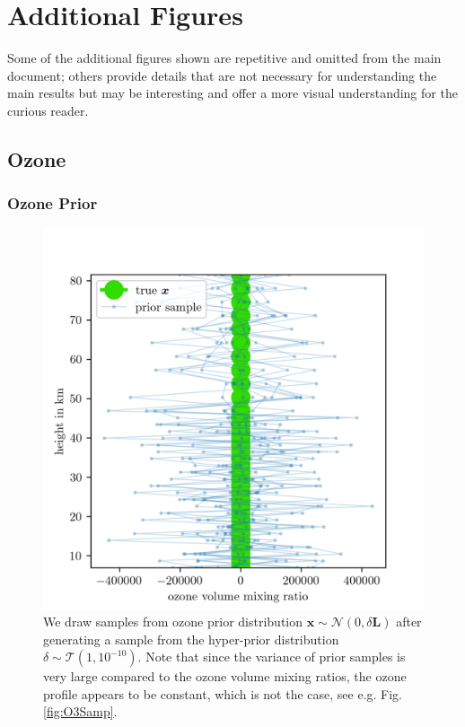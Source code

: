\chapter{Additional Figures}
\label{ap:addFig}
\thispagestyle{empty}
Some of the additional figures shown are repetitive and omitted from the main document; others provide details that are not necessary for understanding the main results but may be interesting and offer a more visual understanding for the curious reader.
\clearpage
\section{Ozone}
\subsection{Ozone Prior}
\begin{figure}[ht!]
	\centering
	\includegraphics{OzonePrior.png}
	\caption[Samples from ozone prior distribution.]{We draw samples from ozone prior distribution $\bm{x} \sim \mathcal{N}(0,\delta \bm{L})$ after generating a sample from the hyper-prior distribution $\delta \sim \mathcal{T}(1,10^{-10})$. Note that since the variance of prior samples is very large compared to the ozone volume mixing ratios, the ozone profile appears to be constant, which is not the case, see e.g. Fig. \ref{fig:O3Samp}.}
	\label{fig:O3Prior}
\end{figure}
\clearpage

